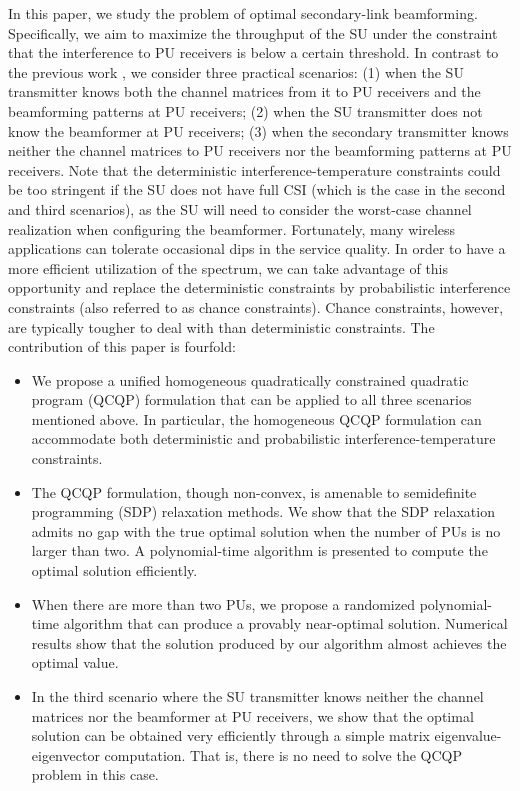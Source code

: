 \documentclass[twocolumn,10pt]{IEEEtran}
\theoremstyle{plain} \newtheorem{theorem}{Theorem}
\theoremstyle{plain} \newtheorem{proposition}{Proposition}
\theoremstyle{plain} \newtheorem{corollary}{Corollary}
\theoremstyle{remark} \newtheorem{remark}{Remark}
\theoremstyle{remark} \newtheorem{lemma}{Lemma}
\theoremstyle{plain} \newtheorem{definition}{Definition}
\theoremstyle{plain} \newtheorem{assumption}{Assumption}
\theoremstyle{plain} \newtheorem{fact}{Fact}
\begin{document}
In this paper, we study the problem of optimal secondary-link beamforming. Specifically, we aim to maximize the throughput of the SU under the constraint that the interference to PU receivers is below a certain threshold. In contrast to the previous work \cite{KG08,ZL08,SF09}, we consider three practical scenarios: (1) when the SU transmitter knows both the channel matrices from it to PU receivers and the beamforming patterns at PU receivers; (2) when the SU transmitter does not know the beamformer at PU receivers; (3) when the secondary transmitter knows neither the channel matrices to PU receivers nor the beamforming patterns at PU receivers. Note that the deterministic interference-temperature constraints could be too stringent if the SU does not have full CSI (which is the case in the second and third scenarios), as the SU will need to consider the worst-case channel realization when configuring the beamformer. Fortunately, many wireless applications can tolerate occasional dips in the service quality. In order to have a more efficient utilization of the spectrum, we can take advantage of this opportunity and replace the deterministic constraints by probabilistic interference constraints (also referred to as chance constraints). Chance constraints, however, are typically tougher to deal with than deterministic constraints.
The contribution of this paper is fourfold:
\begin{itemize}
  \item We propose a unified homogeneous quadratically constrained quadratic program (QCQP) formulation that can be applied to all three scenarios mentioned above. In particular, the homogeneous QCQP formulation can accommodate both deterministic and probabilistic interference-temperature constraints.
  \item The QCQP formulation, though non-convex, is amenable to semidefinite programming (SDP) relaxation methods. We show that the SDP relaxation admits no gap with the true optimal solution when the number of PUs is no larger than two. A polynomial-time algorithm is presented to compute the optimal solution efficiently.
  \item When there are more than two PUs, we propose a randomized polynomial-time algorithm that can produce a provably near-optimal solution. Numerical results show that the solution produced by our algorithm almost achieves the optimal value.
  \item In the third scenario where the SU transmitter knows neither the channel matrices nor the beamformer at PU receivers, we show that the optimal solution can be obtained very efficiently through a simple matrix eigenvalue-eigenvector computation. That is, there is no need to solve the QCQP problem in this case.
\end{itemize}
\end{document}
